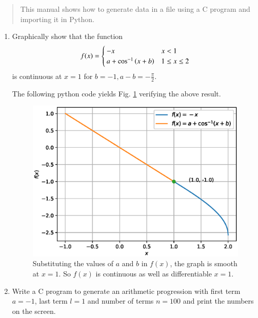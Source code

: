 \documentclass[journal,12pt,twocolumn]{IEEEtran}
\begin{document}
\begin{abstract}
This manual shows how to generate data in a file using a C program and importing it in Python.  
\end{abstract}
\begin{enumerate}
\item
Graphically show that the function
%
\begin{equation}
\label{eq:fx}
f(x)=
\begin{cases}
-x & x < 1 \\
a + \cos^{-1}\brak{x + b} & 1 \leq x \leq 2
\end{cases}
\end{equation}
%
is continuous at $x = 1$ for $b = -1, a - b =  - \frac{\pi}{2}$.  

\solution
%
The following python code yields Fig. \ref{fig:EE1083/pythonc/5} verifying the above result.

\begin{figure}[!ht]
\begin{center}
\includegraphics[width=\columnwidth]{./EE1083/pythonc/figs/ee16b1005}
\end{center}
\caption{Substituting the values of $a$ and $b$ in $f(x)$, the graph is smooth at $x=1$. So $f(x)$ is continuous as well as differentiable $x=1$.}
\label{fig:EE1083/pythonc/5}	
\end{figure}
%
\item
Write a C program to generate an arithmetic progression with first term $a=-1$, last term $l=1$ and number of terms $n=100$ and print the numbers on the screen.


\end{enumerate}
\end{document}
